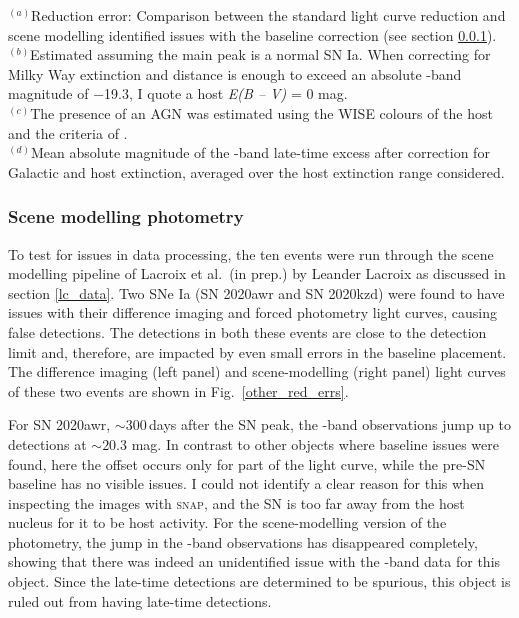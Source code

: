 \documentclass[a4paper,oneside,12pt, class=Latex/Classes/PhDthesisPSnPDF, crop=false]{standalone}
\begin{document}
\begin{table}
 \label{alt_trans_res}
\begin{flushleft}
$^{(a)}$Reduction error: Comparison between the standard light curve reduction and scene modelling identified issues with the baseline correction (see section \ref{sec:scene_modelling}).\\
$^{(b)}$Estimated assuming the main peak is a normal SN Ia. When correcting for Milky Way extinction and distance is enough to exceed an absolute \ztfg-band magnitude of $-$19.3, I quote a host \textit{E(B -- V)} = 0 mag. \\
$^{(c)}$The presence of an AGN was estimated using the WISE colours of the host and the criteria of \cite{WISE_crit}.\\
$^{(d)}$Mean absolute magnitude of the \ztfr-band late-time excess after correction for Galactic and host extinction, averaged over the host extinction range considered.\\
\end{flushleft}
\end{table} 


\subsubsection{Scene modelling photometry}
\label{sec:scene_modelling}
To test for issues in data processing, the ten events were run through the scene modelling pipeline of Lacroix et al.~(in prep.) by Leander Lacroix as discussed in section \ref{lc_data}. Two SNe Ia (SN 2020awr and SN 2020kzd) were found to have issues with their difference imaging and forced photometry light curves, causing false detections. The detections in both these events are close to the detection limit and, therefore, are impacted by even small errors in the baseline placement. The difference imaging (left panel) and scene-modelling (right panel) light curves of these two events are shown in Fig.~\ref{other_red_errs}.

For SN 2020awr, $\sim300$\,days after the SN peak, the \ztfi-band observations jump up to detections at $\sim20.3$ mag. In contrast to other objects where baseline issues were found, here the offset occurs only for part of the light curve, while the pre-SN baseline has no visible issues. I could not identify a clear reason for this when inspecting the images with \textsc{snap}, and the SN is too far away from the host nucleus for it to be host activity. For the scene-modelling version of the photometry, the jump in the \ztfi-band observations has disappeared completely, showing that there was indeed an unidentified issue with the \ztfi-band data for this object. Since the late-time detections are determined to be spurious, this object is ruled out from having late-time detections.
\end{document}
